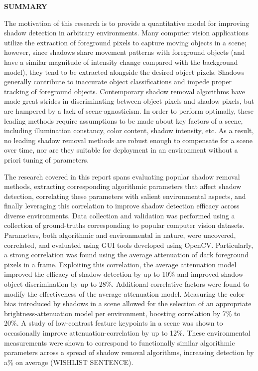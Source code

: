 \documentclass[12pt]{report}
\begin{document}
\doublespacing

\clearpage
\begin{centering}
\textbf{SUMMARY}\\
\vspace{\baselineskip}
\end{centering}

The motivation of this research is to provide a quantitative model for improving shadow detection in arbitrary environments. Many computer vision applications utilize the extraction of foreground pixels to capture moving objects in a scene; however, since shadows share movement patterns with foreground objects (and have a similar magnitude of intensity change compared with the background model), they tend to be extracted alongside the desired object pixels. Shadows generally contribute to inaccurate object classifications and impede proper tracking of foreground objects. Contemporary shadow removal algorithms have made great strides in discriminating between object pixels and shadow pixels, but are hampered by a lack of scene-agnosticism. In order to perform optimally, these leading methods require assumptions to be made about key factors of a scene, including illumination constancy, color content, shadow intensity, etc. As a result, no leading shadow removal methods are robust enough to compensate for a scene over time, nor are they suitable for deployment in an environment without a priori tuning of parameters.

The research covered in this report spans evaluating popular shadow removal methods, extracting corresponding algorithmic parameters that affect shadow detection, correlating these parameters with salient environmental aspects, and finally leveraging this correlation to improve shadow detection efficacy across diverse environments. Data collection and validation was performed using a collection of ground-truths corresponding to popular computer vision datasets. Parameters, both algorithmic and environmental in nature, were uncovered, correlated, and evaluated using GUI tools developed using OpenCV. Particularly, a strong correlation was found using the average attenuation of dark foreground pixels in a frame. Exploiting this correlation, the average attenuation model improved the efficacy of shadow detection by up to 10\% and improved shadow-object discrimination by up to 28\%. Additional correlative factors were found to modify the effectiveness of the average attenuation model. Measuring the color bias introduced by shadows in a scene allowed for the selection of an appropriate brightness-attenuation model per environment, boosting correlation by 7\% to 20\%. A study of low-contrast feature keypoints in a scene was shown to occasionally improve attenuation-correlation by up to 12\%. These environmental measurements were shown to correspond to functionally similar algorithmic parameters across a spread of shadow removal algorithms, increasing detection by a\% on average (WISHLIST SENTENCE).

\end{document}
